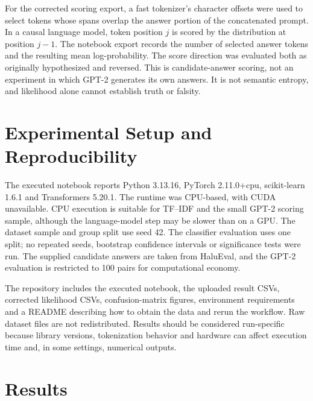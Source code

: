 \documentclass[11pt]{article}
\begin{document}
For the corrected scoring export, a fast tokenizer's character offsets were used to select tokens whose spans overlap the answer portion of the concatenated prompt. In a causal language model, token position $j$ is scored by the distribution at position $j-1$. The notebook export records the number of selected answer tokens and the resulting mean log-probability. The score direction was evaluated both as originally hypothesized and reversed. This is candidate-answer scoring, not an experiment in which GPT-2 generates its own answers. It is not semantic entropy, and likelihood alone cannot establish truth or falsity.

\section{Experimental Setup and Reproducibility}
The executed notebook reports Python 3.13.16, PyTorch 2.11.0+cpu, scikit-learn 1.6.1 and Transformers 5.20.1. The runtime was CPU-based, with CUDA unavailable. CPU execution is suitable for TF--IDF and the small GPT-2 scoring sample, although the language-model step may be slower than on a GPU. The dataset sample and group split use seed 42. The classifier evaluation uses one split; no repeated seeds, bootstrap confidence intervals or significance tests were run. The supplied candidate answers are taken from HaluEval, and the GPT-2 evaluation is restricted to 100 pairs for computational economy.

The repository includes the executed notebook, the uploaded result CSVs, corrected likelihood CSVs, confusion-matrix figures, environment requirements and a README describing how to obtain the data and rerun the workflow. Raw dataset files are not redistributed. Results should be considered run-specific because library versions, tokenization behavior and hardware can affect execution time and, in some settings, numerical outputs.

\section{Results}
\end{document}
